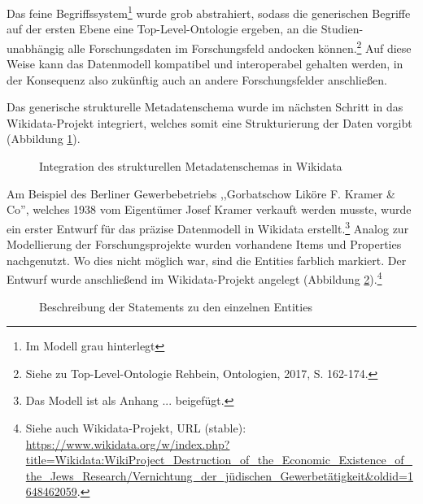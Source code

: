 Das feine Begriffssystem\footnote{Im Modell grau hinterlegt} wurde grob abstrahiert, sodass die generischen Begriffe auf der ersten Ebene eine Top-Level-Ontologie ergeben, an die Studien-unabhängig alle Forschungsdaten im Forschungsfeld andocken können.\footnote{Siehe zu Top-Level-Ontologie Rehbein, Ontologien, 2017, S. 162-174.} Auf diese Weise kann das Datenmodell kompatibel und interoperabel gehalten werden, in der Konsequenz also zukünftig auch an andere Forschungsfelder anschließen.

Das generische strukturelle Metadatenschema wurde im nächsten Schritt in das Wikidata-Projekt integriert, welches somit eine Strukturierung der Daten vorgibt (Abbildung \ref{fig:wikidatagenericmodel}). 

\begin{figure}[h]
    \centering
    \caption{Integration des strukturellen Metadatenschemas in Wikidata}
    \label{fig:wikidatagenericmodel}
\end{figure}

Am Beispiel des Berliner Gewerbebetriebs ,,Gorbatschow Liköre F. Kramer \& Co'', welches 1938 vom Eigentümer Josef Kramer verkauft werden musste, wurde ein erster Entwurf für das präzise Datenmodell in Wikidata erstellt.\footnote{Das Modell ist als Anhang ... beigefügt.} Analog zur Modellierung der Forschungsprojekte wurden vorhandene Items und Properties nachgenutzt. Wo dies nicht möglich war, sind die Entities farblich markiert. Der Entwurf wurde anschließend im Wikidata-Projekt angelegt (Abbildung \ref{fig:wikidatadatamodel}).\footnote{Siehe auch Wikidata-Projekt, URL (stable): \url{https://www.wikidata.org/w/index.php?title=Wikidata:WikiProject\_Destruction\_of\_the\_Economic\_Existence\_of\_the\_Jews\_Research/Vernichtung\_der\_jüdischen\_Gewerbetätigkeit&oldid=1648462059}.}   

\begin{figure}[h]
    \centering
    \caption{Beschreibung der Statements zu den einzelnen Entities}
    \label{fig:wikidatadatamodel}
\end{figure}

